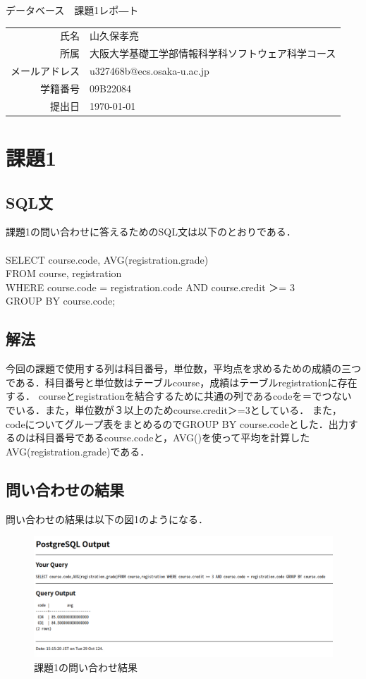 \documentclass[dvipdfmx]{jarticle}
\begin{document}
\begin{titlepage}
    \begin{center}
        {\huge データベース　課題1レポ―ト}
        \vspace{180pt}\\
        \begin{tabular}{rl}
            氏名 & 山久保孝亮\\
            所属 & 大阪大学基礎工学部情報科学科ソフトウェア科学コース\\
            メールアドレス & u327468b@ecs.osaka-u.ac.jp\\
            学籍番号 & 09B22084\\
            提出日 & \today\\
        \end{tabular}
    \end{center}
\end{titlepage}
\section{課題1}
\subsection{SQL文}
課題1の問い合わせに答えるためのSQL文は以下のとおりである．\\\\
SELECT course.code, AVG(registration.grade)\\
    FROM course, registration\\
    WHERE course.code = registration.code AND course.credit ＞= 3\\
    GROUP BY course.code;
\subsection{解法}
今回の課題で使用する列は科目番号，単位数，平均点を求めるための成績の三つである．科目番号と単位数はテーブルcourse，成績はテーブルregistrationに存在する．
courseとregistrationを結合するために共通の列であるcodeを＝でつないでいる．また，単位数が３以上のためcourse.credit＞=3としている．
また，codeについてグループ表をまとめるのでGROUP BY course.codeとした．出力するのは科目番号であるcourse.codeと，AVG()を使って平均を計算したAVG(registration.grade)である．

\subsection{問い合わせの結果}
問い合わせの結果は以下の図1のようになる．
\begin{figure}[h]
    \centering
    \includegraphics[width=12cm]{kadai1.png}
    \caption{課題1の問い合わせ結果}
\end{figure}
\end{document}
